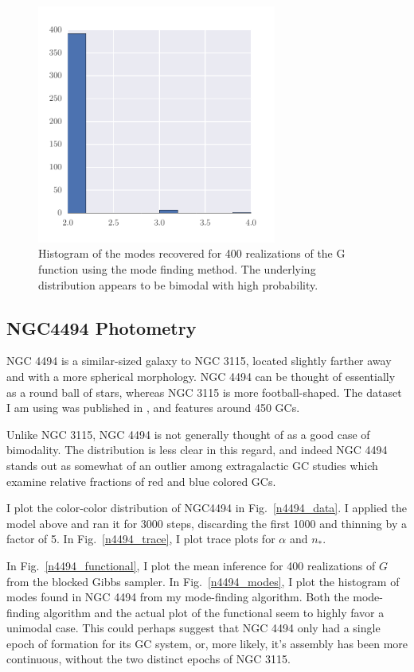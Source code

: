 \documentclass{article}
\begin{document}
\begin{figure}
\centering
\includegraphics[width=0.7\textwidth]{n3115_mode_post.pdf}
\caption{Histogram of the modes recovered for 400 realizations of the G function
using the mode finding method. The underlying distribution appears to be bimodal with high probability.}
\label{n3115_modes}
\end{figure}

\subsection{NGC4494 Photometry}
NGC 4494 is a similar-sized galaxy to NGC 3115, located slightly farther away and with a more spherical morphology.
NGC 4494 can be thought of essentially as a round ball of stars, whereas NGC 3115 is more football-shaped.
The dataset I am using was published in \citealt{foster2011}, and features around 450 GCs.

Unlike NGC 3115, NGC 4494 is not generally thought of as a good case of bimodality. The distribution is less clear in
this regard,
and indeed NGC 4494 stands out as somewhat of an outlier among extragalactic GC studies which examine relative
fractions of red and blue colored GCs. 

I plot the color-color distribution of NGC4494 in Fig.~\ref{n4494_data}. I applied the model above and ran it for
3000 steps, discarding the first 1000 and thinning by a factor of 5.
In Fig.~\ref{n4494_trace}, I plot trace plots for $\alpha$ and $n_*$.

In Fig.~\ref{n4494_functional}, I plot the mean inference for 400 realizations
of $G$ from the blocked Gibbs sampler. In Fig.~\ref{n4494_modes}, I plot the histogram of modes found in NGC 4494
from my mode-finding algorithm. Both the mode-finding algorithm and the actual plot of the functional seem to highly
favor a unimodal case. This could perhaps suggest that NGC 4494 only had a single epoch of formation for its GC system,
or, more likely, it's assembly has been more continuous, without the two distinct epochs of NGC 3115.
\end{document}
